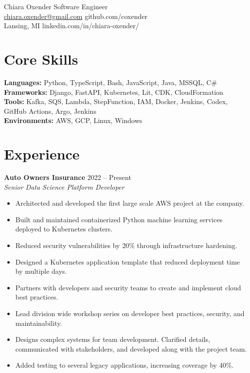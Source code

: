 \documentclass[11pt]{article}
\begin{document}
{\LARGE Chiara Oxender} \hfill Software Engineer\\
\href{mailto:chiara.oxender@gmail.com}{chiara.oxender@gmail.com} \hfill github.com/coxender\\
Lansing, MI \hfill linkedin.com/in/chiara-oxender/


\section*{Core Skills}
\textbf{Languages:} Python, TypeScript, Bash, JavaScript, Java, MSSQL, C\# \\
\textbf{Frameworks:} Django, FastAPI,  Kubernetes, Lit, CDK, CloudFormation\\
\textbf{Tools:} Kafka, SQS, Lambda, StepFunction, IAM, Docker, Jenkins, Codex, GitHub Actions, Argo, Jenkins \\
\textbf{Environments:} AWS, GCP, Linux, Windows\\

\section*{Experience}
\textbf{Auto Owners Insurance} \hfill 2022 -- Present\\
\textit{Senior Data Science Platform Developer}
\begin{itemize}
  \item Architected and developed the first large scale AWS project at the company.
  \item Built and maintained containerized Python machine learning services deployed to Kubernetes clusters.
  \item Reduced security vulnerabilities by 20\% through infrastructure hardening.
 \item Designed a Kubernetes application template that reduced deployment time by multiple days.
 \item Partners with developers and security teams to  create and implement cloud best practices.
 \item Lead division wide workshop series on developer best practices, security, and maintainability.
 \item Designs complex systems for team development. Clarified details, communicated with stakeholders, and developed along with the project team. 
 \item Added testing to several legacy applications, increasing coverage by 40\%.
\end{itemize}
\end{document}

